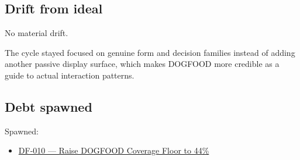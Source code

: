 \subsection{Drift from ideal}\label{record-071-drift-from-ideal}

No material drift.

The cycle stayed focused on genuine form and decision families instead of adding another passive display surface, which makes DOGFOOD more credible as a guide to actual interaction patterns.

\subsection{Debt spawned}\label{record-071-debt-spawned}

Spawned:

\begin{itemize}
\tightlist
\item
  \href{https://github.com/flyingrobots/bijou/blob/cbd70612140e7a450d764b3c7be1c6af878b99bc/docs/design/DF-010-raise-dogfood-coverage-floor-to-44-percent.md}{DF-010 --- Raise DOGFOOD Coverage Floor to 44\%}
\end{itemize}

